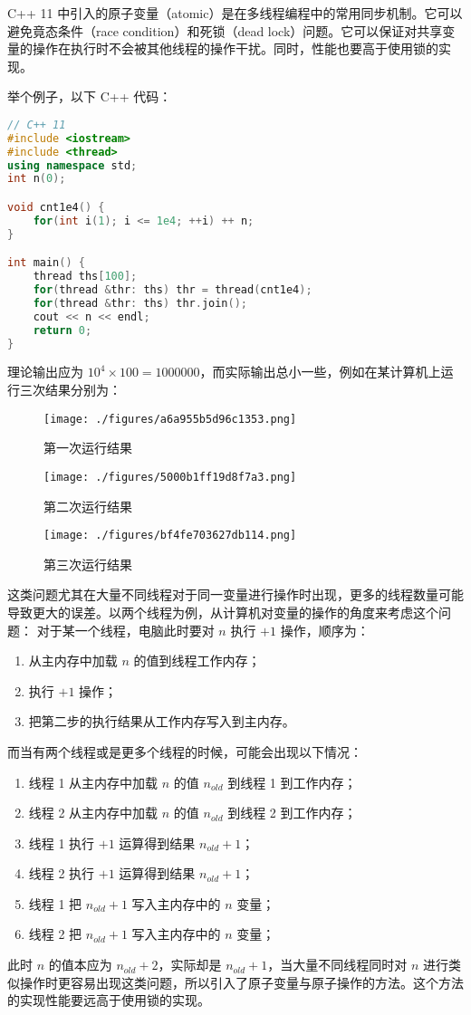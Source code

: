 


C++ 11 中引入的原子变量（atomic）是在多线程编程中的常用同步机制。它可以避免竟态条件（race condition）和死锁（dead lock）问题。它可以保证对共享变量的操作在执行时不会被其他线程的操作干扰。同时，性能也要高于使用锁的实现。

举个例子，以下 C++ 代码：
\begin{lstlisting}[language=cpp]
// C++ 11
#include <iostream>
#include <thread>
using namespace std;
int n(0);

void cnt1e4() {
	for(int i(1); i <= 1e4; ++i) ++ n;
}

int main() {
	thread ths[100];
	for(thread &thr: ths) thr = thread(cnt1e4);
	for(thread &thr: ths) thr.join();
	cout << n << endl;
	return 0;
}
\end{lstlisting}
理论输出应为 $10^4 \times 100 = 1000000$，而实际输出总小一些，例如在某计算机上运行三次结果分别为：
\begin{figure}[ht]
\centering
\texttt{[image: ./figures/a6a955b5d96c1353.png]}
\caption{第一次运行结果} \label{fig_atomVO_1}
\end{figure}
\begin{figure}[ht]
\centering
\texttt{[image: ./figures/5000b1ff19d8f7a3.png]}
\caption{第二次运行结果} \label{fig_atomVO_2}
\end{figure}
\begin{figure}[ht]
\centering
\texttt{[image: ./figures/bf4fe703627db114.png]}
\caption{第三次运行结果} \label{fig_atomVO_3}
\end{figure}
这类问题尤其在大量不同线程对于同一变量进行操作时出现，更多的线程数量可能导致更大的误差。以两个线程为例，从计算机对变量的操作的角度来考虑这个问题：
对于某一个线程，电脑此时要对 $n$ 执行 $+1$ 操作，顺序为：
\begin{enumerate}
\item 从主内存中加载 $n$ 的值到线程工作内存；
\item 执行 $+1$ 操作；
\item 把第二步的执行结果从工作内存写入到主内存。
\end{enumerate}
而当有两个线程或是更多个线程的时候，可能会出现以下情况：
\begin{enumerate}
\item 线程 1 从主内存中加载 $n$ 的值 $n_{old}$ 到线程 1 到工作内存；
\item 线程 2 从主内存中加载 $n$ 的值 $n_{old}$ 到线程 2 到工作内存；
\item 线程 1 执行 $+1$ 运算得到结果 $n_{old}+1$；
\item 线程 2 执行 $+1$ 运算得到结果 $n_{old}+1$；
\item 线程 1 把 $n_{old}+1$ 写入主内存中的 $n$ 变量；
\item 线程 2 把 $n_{old}+1$ 写入主内存中的 $n$ 变量；
\end{enumerate}
此时 $n$ 的值本应为 $n_{old} + 2$，实际却是 $n_{old}+1$，当大量不同线程同时对 $n$ 进行类似操作时更容易出现这类问题，所以引入了原子变量与原子操作的方法。这个方法的实现性能要远高于使用锁的实现。


